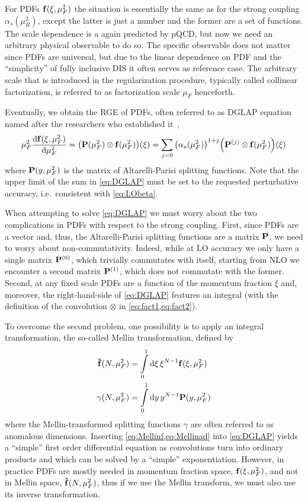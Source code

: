 For PDFs $\vb f(\xi, \mu_F^2)$ the situation is essentially the same as for the strong coupling $\alpha_s(\mu_R^2)$, except the latter is just a number and the former are a set of functions.
The scale dependence is a again predicted by pQCD, but now we need an arbitrary physical observable to do so.
The specific observable does not matter since PDFs are universal, but due to the linear dependence on PDF and the \enquote{simplicity} of fully inclusive DIS it often serves as reference case.
The arbitrary scale that is introduced in the regularization procedure, typically called collinear factorization, is referred to as factorization scale $\mu_F$ henceforth.

Eventually, we obtain the RGE of PDFs, often referred to as DGLAP equation named after the researchers who established it~\cite{Altarelli:1977zs,Gribov:1972ri,Dokshitzer:1977sg},
\begin{equation}
    \mu_F^2 \dv{\vb f(\xi,\mu_F^2)}{\mu_F^2} = \qty(\vb P (\mu_F^2) \otimes \vb f(\mu_F^2))(\xi) = \sum_{j=0} \qty(\alpha_s(\mu_F^2))^{1+j} \qty(\vb P^{(j)} \otimes \vb f(\mu_F^2))(\xi) \label{eq:DGLAP}
\end{equation}
where $\vb P (y, \mu_F^2)$ is the matrix of Altarelli-Parisi splitting functions.
Note that the upper limit of the sum in \cref{eq:DGLAP} must be set to the requested perturbative accuracy, i.e.\ consistent with \cref{eq:LObeta}.

When attempting to solve \cref{eq:DGLAP} we must worry about the two complications in PDFs with respect to the strong coupling.
First, since PDFs are a vector and, thus, the Altarelli-Parisi splitting functions are a matrix $\vb P$, we need to worry about non-commutativity.
Indeed, while at LO accuracy we only have a single matrix $\vb P^{(0)}$, which trivially commutates with itself, starting from NLO we encounter a second matrix $\vb P^{(1)}$, which does not commutate with the former.
Second, at any fixed scale PDFs are a function of the momentum fraction $\xi$ and, moreover, the right-hand-side of \cref{eq:DGLAP} features an integral (with the definition of the convolution $\otimes$ in \cref{eq:fact1,eq:fact2}).

To overcome the second problem, one possibility is to apply an integral transformation, the so-called Mellin transformation, defined by
\begin{align}
    \vb{\tilde f}(N,\mu_F^2) &= \int\limits_0^1 \dd \xi\,\xi^{N-1} \vb f(\xi,\mu_F^2) \label{eq:Mellinf} \\
    \gamma(N,\mu_F^2) &= \int\limits_0^1 \dd y\,y^{N-1} \vb P(y,\mu_F^2) \label{eq:Mellinad}
\end{align}
where the Mellin-transformed splitting functions $\gamma$ are often referred to as anomalous dimensions.
Inserting \cref{eq:Mellinf,eq:Mellinad} into \cref{eq:DGLAP} yields a \enquote{simple} first order differential equation as convolutions turn into ordinary products and which can be solved by a \enquote{simple} exponentiation.
However, in practice PDFs are mostly needed in momentum fraction space, $\vb f(\xi,\mu_F^2)$, and not in Mellin space, $\vb{\tilde f}(N,\mu_F^2)$, thus if we use the Mellin transform, we must also use its inverse transformation.

